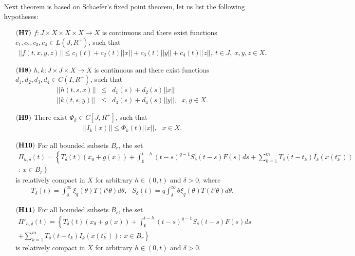 \documentclass[11pt]{article}
\begin{document}
Next theorem is based on Schaefer's fixed point theorem, let us list the following hypotheses:
\begin{enumerate}
\item[$\bf (H7)$] $f:J \times X \times X \times X \rightarrow X $ is continuous and there exist functions $c_1, c_2, c_3,c_4 \in L(J,R^+)$, such that
\begin{eqnarray*}
||f(t,x,y,z)|| \leq c_1(t)+c_2(t)||x||+c_3(t)||y||+c_4(t)||z||, \ t\in J, \ x,y,z\in X.
\end{eqnarray*}
\item[$\bf (H8)$]$h,k:J\times J \times X \rightarrow X$ is continuous and there exist functions $d_1,d_2,d_3,d_4 \in C(I,R^+)$, such that
\begin{eqnarray*}
||h(t,s,x)|| & \leq & d_1(s)+d_2(s)||x||\\
||k(t,s,y)|| & \leq & d_3(s)+d_4(s) ||y||, \ \ \ x,y\in X.
\end{eqnarray*}
\item[$\bf (H9)$] There exist $ \Phi_k \in C[J,R^+]$, such that
\begin{eqnarray*}
||I_k(x)|| \leq \Phi_k(t)||x||, \ \ \ x\in X.
\end{eqnarray*}
\item[$\bf (H10)$] For all bounded subsets $B_r$, the set
\begin{eqnarray*}
\Pi_{h,\delta}(t)=\left\{T_\delta(t)(x_0+g(x))+\int_0^{t-h}(t-s)^{q-1}S_\delta (t-s)F(s)ds+\displaystyle \sum_{k=1}^m T_\delta(t-t_k)I_k(x(t_k^-)) \right. \\ \left. : \ x\in B_r \right\}
\end{eqnarray*}
is relatively compact in $X$ for arbitrary $h \in (0,t)$ and $\delta >0$, where
\begin{eqnarray*}
T_\delta (t)=\int^\infty_\delta \xi_q(\theta)T(t^q\theta)d\theta, \ \ \ S_\delta(t)=q\int^\infty_\delta \theta \xi _q(\theta)T(t^q\theta)d\theta.
\end{eqnarray*}
\item[$\bf (H11)$]For all bounded subsets $B_r$, the set
\begin{eqnarray*}
\Pi '_{h,\delta}(t)=\left\{T_\delta(t)(x_0+g(x))+\int_0^{t-h}(t-s)^{q-1}S_\delta (t-s)F(s)ds\right. \\ \left.+\displaystyle \sum_{k=1}^m T_\delta(t-t_k)I_k(x(t_k^-))  : \ x\in B_r \right\}
\end{eqnarray*}
is relatively compact in $X$ for arbitrary $h\in (0,t)$ and $\delta >0$.
\end{enumerate}
\end{document}
